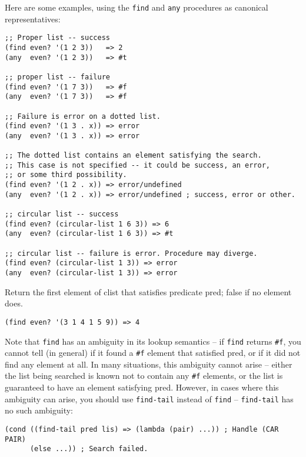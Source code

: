 Here are some examples, using the \texttt{find} and \texttt{any}
procedures as canonical representatives:

\begin{verbatim}
;; Proper list -- success
(find even? '(1 2 3))   => 2
(any  even? '(1 2 3))   => #t

;; proper list -- failure
(find even? '(1 7 3))   => #f
(any  even? '(1 7 3))   => #f

;; Failure is error on a dotted list.
(find even? '(1 3 . x)) => error
(any  even? '(1 3 . x)) => error

;; The dotted list contains an element satisfying the search.
;; This case is not specified -- it could be success, an error, 
;; or some third possibility.
(find even? '(1 2 . x)) => error/undefined
(any  even? '(1 2 . x)) => error/undefined ; success, error or other.

;; circular list -- success
(find even? (circular-list 1 6 3)) => 6
(any  even? (circular-list 1 6 3)) => #t

;; circular list -- failure is error. Procedure may diverge.
(find even? (circular-list 1 3)) => error
(any  even? (circular-list 1 3)) => error
\end{verbatim}

\begin{entry}{%
  }

  Return the
  first element of clist that satisfies predicate pred; false if no
  element does.

\begin{verbatim}
(find even? '(3 1 4 1 5 9)) => 4
\end{verbatim}

  Note that \texttt{find} has an ambiguity in its lookup semantics --
  if \texttt{find} returns \texttt{\#f}, you cannot tell (in general)
  if it found a \texttt{\#f} element that satisfied pred, or if it did
  not find any element at all. In many situations, this ambiguity
  cannot arise -- either the list being searched is known not to
  contain any \texttt{\#f} elements, or the list is guaranteed to have
  an element satisfying pred.  However, in cases where this ambiguity
  can arise, you should use \texttt{find-tail} instead of
  \texttt{find} -- \texttt{find-tail} has no such ambiguity:

\begin{verbatim}
(cond ((find-tail pred lis) => (lambda (pair) ...)) ; Handle (CAR PAIR)
      (else ...)) ; Search failed.
\end{verbatim}
\end{entry}

